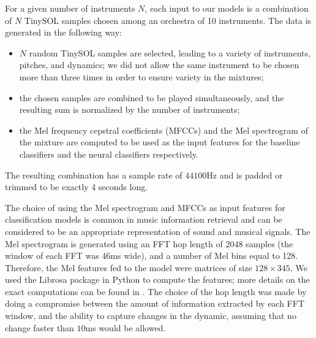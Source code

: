 \documentclass{article}
\begin{document}

For a given number of instruments $N$, each input to our models is a combination of $N$ TinySOL samples chosen among an orchestra of 10 instruments. The data is generated in the following way: 

\begin{itemize}
\item $N$ random TinySOL samples are selected, leading to a variety of instruments, pitches, and dynamics; we did not allow the same instrument to be chosen more than three times in order to ensure variety in the mixtures;
\item the chosen samples are combined to be played simultaneously, and the resulting sum is normalized by the number of instruments;
\item the Mel frequency cepstral coefficients (MFCCs) and the Mel spectrogram of the mixture are computed to be used as the input features for the baseline classifiers and the neural classifiers respectively.
\end{itemize}

The resulting combination has a sample rate of $44100$Hz and is padded or trimmed to be exactly 4 seconds long.

The choice of using the Mel spectrogram and MFCCs as input features for classification models is common in music information retrieval \cite{McKinney2003} and can be considered to be an appropriate representation of sound and musical signals. The Mel spectrogram is generated using an FFT hop length of 2048 samples (the window of each FFT was $46$ms wide), and a number of Mel bins equal to 128. Therefore, the Mel features fed to the model were matrices of size $128\times 345$. We used the Librosa package in Python to compute the features; more details on the exact computations can be found in \cite{mcfee15}. The choice of the hop length was made by doing a compromise between the amount of information extracted by each FFT window, and the ability to capture changes in the dynamic, assuming that no change faster than $10$ms would be allowed.
\end{document}
